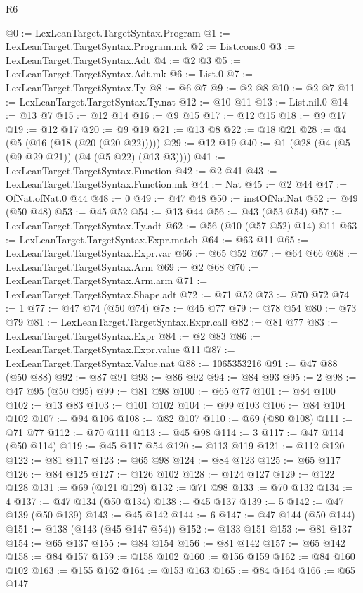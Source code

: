 \begin{lexlean}{R6}
\begin{coremodule}
@0 := LexLeanTarget.TargetSyntax.Program
@1 := LexLeanTarget.TargetSyntax.Program.mk
@2 := List.cons.{0}
@3 := LexLeanTarget.TargetSyntax.Adt
@4 := @2 @3
@5 := LexLeanTarget.TargetSyntax.Adt.mk
@6 := List.{0}
@7 := LexLeanTarget.TargetSyntax.Ty
@8 := @6 @7
@9 := @2 @8
@10 := @2 @7
@11 := LexLeanTarget.TargetSyntax.Ty.nat
@12 := @10 @11
@13 := List.nil.{0}
@14 := @13 @7
@15 := @12 @14
@16 := @9 @15
@17 := @12 @15
@18 := @9 @17
@19 := @12 @17
@20 := @9 @19
@21 := @13 @8
@22 := @18 @21
@28 := @4 (@5 (@16 (@18 (@20 (@20 @22)))))
@29 := @12 @19
@40 := @1 (@28 (@4 (@5 (@9 @29 @21)) (@4 (@5 @22) (@13 @3))))
@41 := LexLeanTarget.TargetSyntax.Function
@42 := @2 @41
@43 := LexLeanTarget.TargetSyntax.Function.mk
@44 := Nat
@45 := @2 @44
@47 := OfNat.ofNat.{0} @44
@48 := 0
@49 := @47 @48
@50 := instOfNatNat
@52 := @49 (@50 @48)
@53 := @45 @52
@54 := @13 @44
@56 := @43 (@53 @54)
@57 := LexLeanTarget.TargetSyntax.Ty.adt
@62 := @56 (@10 (@57 @52) @14) @11
@63 := LexLeanTarget.TargetSyntax.Expr.match
@64 := @63 @11
@65 := LexLeanTarget.TargetSyntax.Expr.var
@66 := @65 @52
@67 := @64 @66
@68 := LexLeanTarget.TargetSyntax.Arm
@69 := @2 @68
@70 := LexLeanTarget.TargetSyntax.Arm.arm
@71 := LexLeanTarget.TargetSyntax.Shape.adt
@72 := @71 @52
@73 := @70 @72
@74 := 1
@77 := @47 @74 (@50 @74)
@78 := @45 @77
@79 := @78 @54
@80 := @73 @79
@81 := LexLeanTarget.TargetSyntax.Expr.call
@82 := @81 @77
@83 := LexLeanTarget.TargetSyntax.Expr
@84 := @2 @83
@86 := LexLeanTarget.TargetSyntax.Expr.value @11
@87 := LexLeanTarget.TargetSyntax.Value.nat
@88 := 1065353216
@91 := @47 @88 (@50 @88)
@92 := @87 @91
@93 := @86 @92
@94 := @84 @93
@95 := 2
@98 := @47 @95 (@50 @95)
@99 := @81 @98
@100 := @65 @77
@101 := @84 @100
@102 := @13 @83
@103 := @101 @102
@104 := @99 @103
@106 := @84 @104 @102
@107 := @94 @106
@108 := @82 @107
@110 := @69 (@80 @108)
@111 := @71 @77
@112 := @70 @111
@113 := @45 @98
@114 := 3
@117 := @47 @114 (@50 @114)
@119 := @45 @117 @54
@120 := @113 @119
@121 := @112 @120
@122 := @81 @117
@123 := @65 @98
@124 := @84 @123
@125 := @65 @117
@126 := @84 @125
@127 := @126 @102
@128 := @124 @127
@129 := @122 @128
@131 := @69 (@121 @129)
@132 := @71 @98
@133 := @70 @132
@134 := 4
@137 := @47 @134 (@50 @134)
@138 := @45 @137
@139 := 5
@142 := @47 @139 (@50 @139)
@143 := @45 @142
@144 := 6
@147 := @47 @144 (@50 @144)
@151 := @138 (@143 (@45 @147 @54))
@152 := @133 @151
@153 := @81 @137
@154 := @65 @137
@155 := @84 @154
@156 := @81 @142
@157 := @65 @142
@158 := @84 @157
@159 := @158 @102
@160 := @156 @159
@162 := @84 @160 @102
@163 := @155 @162
@164 := @153 @163
@165 := @84 @164
@166 := @65 @147

\end{coremodule}
\end{lexlean}
